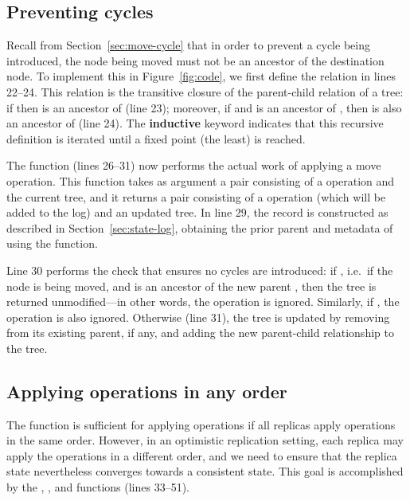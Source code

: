 \documentclass[sigconf]{acmart}
\begin{document}
\subsection{Preventing cycles}\label{sec:prevent-cycles}

Recall from Section~\ref{sec:move-cycle} that in order to prevent a cycle being introduced, the node being moved must not be an ancestor of the destination node.
To implement this in Figure~\ref{fig:code}, we first define the  relation in lines 22--24.
This relation is the transitive closure of the parent-child relation of a tree: if  then  is an ancestor of  (line 23); moreover, if  and  is an ancestor of , then  is also an ancestor of  (line 24).
The \textbf{inductive} keyword indicates that this recursive definition is iterated until a fixed point (the least) is reached.

The  function (lines 26--31) now performs the actual work of applying a move operation.
This function takes as argument a pair consisting of a  operation and the current tree, and it returns a pair consisting of a  operation (which will be added to the log) and an updated tree.
In line 29, the  record is constructed as described in Section~\ref{sec:state-log}, obtaining the prior parent and metadata of  using the  function.

Line 30 performs the check that ensures no cycles are introduced: if , i.e.\ if the node  is being moved, and  is an ancestor of the new parent , then the tree is returned unmodified---in other words, the operation is ignored.
Similarly, if , the operation is also ignored.
Otherwise (line 31), the tree is updated by removing  from its existing parent, if any, and adding the new parent-child relationship  to the tree.

\subsection{Applying operations in any order}\label{sec:applying}

The  function is sufficient for applying operations if all replicas apply operations in the same order.
However, in an optimistic replication setting, each replica may apply the operations in a different order, and we need to ensure that the replica state nevertheless converges towards a consistent state.
This goal is accomplished by the , , and  functions (lines 33--51).
\end{document}
